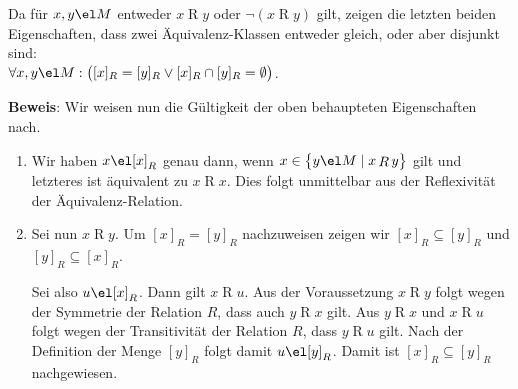\remark
Da für $x,y\el M$ entweder $x \mathop{R} y$ oder $\neg (x \mathop{R} y)$ gilt, zeigen die
letzten beiden Eigenschaften, dass zwei Äquivalenz-Klassen entweder gleich,
oder aber disjunkt sind:
\\[0.2cm]
\hspace*{1.3cm}
$\forall x, y \el M: \bigl([x]_R = [y]_R \vee [x]_R \cap [y]_R = \emptyset\bigr)$.
\vspace*{0.1cm}

\noindent
\textbf{Beweis}:  Wir weisen nun die Gültigkeit der oben behaupteten Eigenschaften nach.
\begin{enumerate}
\item Wir haben $x \el [x]_R$ genau dann, wenn 
      $x \in \bigl\{ y \el M \mid x \mathop{R} y \bigr\}$ gilt und letzteres ist
      äquivalent zu $x \mathop{R} x$.
      Dies folgt unmittelbar aus der Reflexivität der Äquivalenz-Relation.
\item Sei nun $x \mathop{R} y$.  Um $[x]_R = [y]_R$ nachzuweisen zeigen wir
      $[x]_R \subseteq [y]_R$ und $[y]_R \subseteq [x]_R$.

      Sei also 
      $u \el [x]_R$.  Dann gilt $x \mathop{R} u$.  Aus der Voraussetzung
      $x \mathop{R} y$ folgt wegen der Symmetrie der Relation $R$, dass auch
      $y \mathop{R} x$ gilt.  Aus 
      $y \mathop{R} x$ und $x \mathop{R} u$ folgt wegen der Transitivität der Relation
      $R$, dass $y \mathop{R} u$ gilt.  Nach der Definition der
      Menge $[y]_R$ folgt damit $u \el [y]_R$. 
      Damit ist $[x]_R \subseteq [y]_R$ nachgewiesen.


\end{enumerate}
